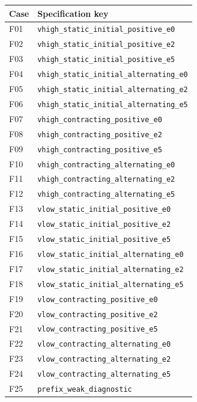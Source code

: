 \begingroup\small\begin{longtable}{lp{.85\linewidth}}\toprule Case & Specification key\\\midrule
F01 & \texttt{vhigh\_static\_initial\_positive\_e0}\\
F02 & \texttt{vhigh\_static\_initial\_positive\_e2}\\
F03 & \texttt{vhigh\_static\_initial\_positive\_e5}\\
F04 & \texttt{vhigh\_static\_initial\_alternating\_e0}\\
F05 & \texttt{vhigh\_static\_initial\_alternating\_e2}\\
F06 & \texttt{vhigh\_static\_initial\_alternating\_e5}\\
F07 & \texttt{vhigh\_contracting\_positive\_e0}\\
F08 & \texttt{vhigh\_contracting\_positive\_e2}\\
F09 & \texttt{vhigh\_contracting\_positive\_e5}\\
F10 & \texttt{vhigh\_contracting\_alternating\_e0}\\
F11 & \texttt{vhigh\_contracting\_alternating\_e2}\\
F12 & \texttt{vhigh\_contracting\_alternating\_e5}\\
F13 & \texttt{vlow\_static\_initial\_positive\_e0}\\
F14 & \texttt{vlow\_static\_initial\_positive\_e2}\\
F15 & \texttt{vlow\_static\_initial\_positive\_e5}\\
F16 & \texttt{vlow\_static\_initial\_alternating\_e0}\\
F17 & \texttt{vlow\_static\_initial\_alternating\_e2}\\
F18 & \texttt{vlow\_static\_initial\_alternating\_e5}\\
F19 & \texttt{vlow\_contracting\_positive\_e0}\\
F20 & \texttt{vlow\_contracting\_positive\_e2}\\
F21 & \texttt{vlow\_contracting\_positive\_e5}\\
F22 & \texttt{vlow\_contracting\_alternating\_e0}\\
F23 & \texttt{vlow\_contracting\_alternating\_e2}\\
F24 & \texttt{vlow\_contracting\_alternating\_e5}\\
F25 & \texttt{prefix\_weak\_diagnostic}\\
\bottomrule\end{longtable}\endgroup
